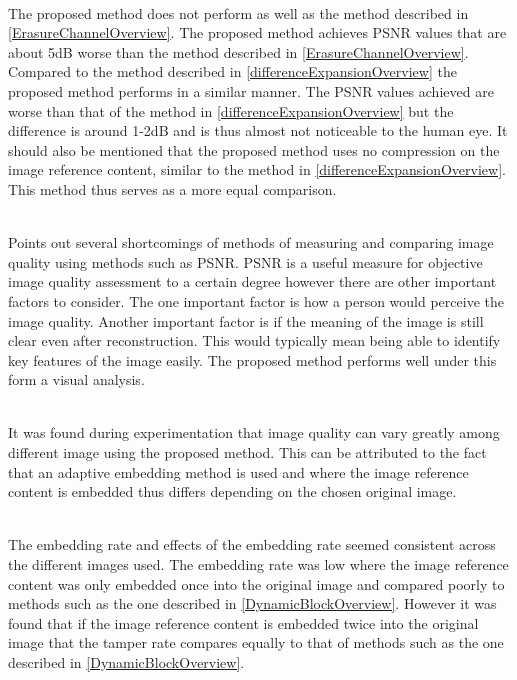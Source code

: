 \documentclass[12pt]{article}
\begin{document}
\hspace{0pt} \\
The proposed method does not perform as well as the method described in \ref{ErasureChannelOverview}.
The proposed method achieves PSNR values that are about 5dB worse than the method described in \ref{ErasureChannelOverview}.
Compared to the method described in \ref{differenceExpansionOverview} the proposed method performs in a similar manner.
The PSNR values achieved are worse than that of the method in \ref{differenceExpansionOverview} but the difference is around 1-2dB and is thus almost not noticeable to the human eye.
It should also be mentioned that the proposed method uses no compression on the image reference content, similar to the method in \ref{differenceExpansionOverview}.
This method thus serves as a more equal comparison. 

\hspace{0pt} \\
\cite{wang2002image} Points out several shortcomings of methods of measuring and comparing image quality using methods such as PSNR. 
PSNR is a useful measure for objective image quality assessment to a certain degree however there are other important factors to consider. 
The one important factor is how a person would perceive the image quality.
Another important factor is if the meaning of the image is still clear even after reconstruction.
This would typically mean being able to identify key features of the image easily. 
The proposed method performs well under this form a visual analysis.

\hspace{0pt} \\
It was found during experimentation that image quality can vary greatly among different image using the proposed method.
This can be attributed to the fact that an adaptive embedding method is used and where the image reference content is embedded thus differs depending on the chosen original image.

\hspace{0pt} \\
The embedding rate and effects of the embedding rate seemed consistent across the different images used.
The embedding rate was low where the image reference content was only embedded once into the original image and compared poorly to methods such as the one described in \ref{DynamicBlockOverview}.
However it was found that if the image reference content is embedded twice into the original image that the tamper rate compares equally to that of methods such as the one described in \ref{DynamicBlockOverview}.
\end{document}
